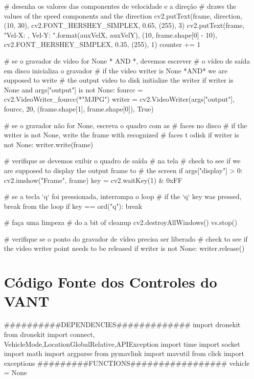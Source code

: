 \begin{apendicesenv}
\begin{python_}
	# desenha os valores das componentes de velocidade e a direção
	# draws the values of the speed components and the direction
	cv2.putText(frame, direction, (10, 30), cv2.FONT_HERSHEY_SIMPLEX,
	0.65, (255), 3)
	cv2.putText(frame, "Vel-X: {}, Vel-Y: {}".format(auxVelX, auxVelY),
	(10, frame.shape[0] - 10), cv2.FONT_HERSHEY_SIMPLEX,
	0.35, (255), 1)
	counter += 1
	
	# se o gravador de vídeo for None * AND *, devemos escrever
	# o vídeo de saída em disco inicializa o gravador
	# if the video writer is None *AND* we are supposed to write
	# the output video to disk initialize the writer
	if writer is None and args["output"] is not None:
		fourcc = cv2.VideoWriter_fourcc(*"MJPG")
		writer = cv2.VideoWriter(args["output"], fourcc, 20,
		(frame.shape[1], frame.shape[0]), True)
	
	# se o gravador não for None, escreva o quadro com as
	# faces no disco
	# if the writer is not None, write the frame with recognized
	# faces t odisk
	if writer is not None:
		writer.write(frame)
	
	# verifique se devemos exibir o quadro de saída
	# na tela
	# check to see if we are supposed to display the output frame to
	# the screen
	if args["display"] > 0:
		cv2.imshow("Frame", frame)
		key = cv2.waitKey(1) & 0xFF
	
	# se a tecla `q` foi pressionada, interrompa o loop
	# if the `q` key was pressed, break from the loop
	if key == ord("q"):
		break
	
	# faça uma limpeza
	# do a bit of cleanup
	cv2.destroyAllWindows()
	vs.stop()
	
	# verifique se o ponto do gravador de vídeo precisa ser liberado
	# check to see if the video writer point needs to be released
	if writer is not None:
		writer.release()
\end{python_}

\chapter{Código Fonte dos Controles do VANT}

\begin{python_}
##########DEPENDENCIES#############
import dronekit
from dronekit import connect, VehicleMode,LocationGlobalRelative,APIException
import time
import socket
import math
import argparse
from pymavlink import mavutil
from click import exceptions
#########FUNCTIONS#################
vehicle = None


\end{python_}
\end{apendicesenv}
